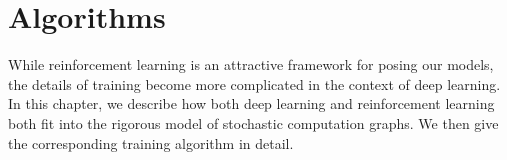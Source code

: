 \documentclass[12pt]{report}
\begin{document}
%
%



\chapter{Algorithms}
\label{chap:algorithms}

While reinforcement learning is an attractive framework for posing our models, the details of training become more complicated in the context of deep learning.
In this chapter, we describe how both deep learning and reinforcement learning both fit into the rigorous model of stochastic computation graphs.
We then give the corresponding training algorithm in detail.
\end{document}
